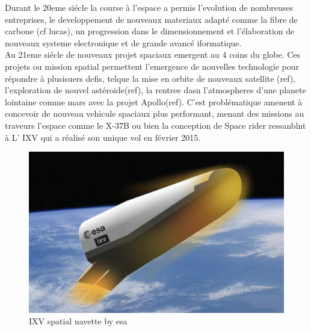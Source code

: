 
Durant le 20eme siécle la course à l'espace a permis l'evolution de nombreuses entreprises, le developpement de nouveaux materiaux adapté comme la fibre de carbone (cf lucas), un progression dans le dimensionnement et l'élaboration de nouveaux systeme electronique et de grande avancé iformatique.\\
Au 21eme siécle de nouveaux projet spaciaux emergent au 4 coins du globe. Ces projets ou mission spatial permettent l'emergence de nouvelles technologie pour répondre à plusisuers defis, telque la mise en orbite de nouveaux satellite (ref), l'exploration de nouvel astéroide(ref), la rentree dasn l'atmospheres d'une planete lointaine comme mars avec la projet Apollo(ref). C'est problématique amenent à concevoir de nouveau vehicule spaciaux plus performant, menant des missions au traveurs l'espace comme le X-37B ou bien la conception de Space rider ressanblnt à L' IXV qui a réalisé son unique vol en février 2015.\\

\begin{figure}[h!]
 \centering
 \includegraphics[width=0.6\linewidth]{chapter1_introduction/pictures/IXV_pillars.jpg}
 \vspace{-2ex}
 \caption{IXV spatial navette by esa}
  \vspace{2ex}
 \label{IXV}
\end{figure}

